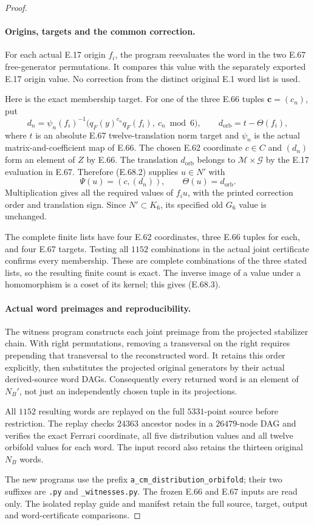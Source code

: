 \begin{proof}
\paragraph{Origins, targets and the common correction.}
For each actual E.17 origin $f_i$, the program
reevaluates the word in the two E.67 free-generator
permutations. It compares this value with the
separately exported E.17 origin value. No correction
from the distinct original E.1 word list is used.

Here is the exact membership target. For one of the
three E.66 tuples $\mathbf c=(c_n)$, put
\[
 d_n=
 \psi_n(f_i)^{-1}
       \bigl(q_F(y)^{c_n}q_F(f_i),\ c_n\bmod6\bigr),
 \qquad
 d_{\mathrm{orb}}=t-\Theta(f_i),
 \tag{E.68.7}
\]
where $t$ is an absolute E.67 twelve-translation norm
target and $\psi_n$ is the actual matrix-and-coefficient
map of E.66. The chosen E.62 coordinate $c\in C$
and $(d_n)$ form an element of $Z$ by E.66. The
translation $d_{\mathrm{orb}}$ belongs to
$\mathcal M\times\mathcal G$ by the E.17 evaluation
in E.67. Therefore \textup{(E.68.2)} supplies
$u\in N'$ with
\[
          \Psi(u)=(c,(d_n)),\qquad
          \Theta(u)=d_{\mathrm{orb}}.
 \tag{E.68.8}
\]
Multiplication gives all the required values of
$f_i u$, with the printed correction order and
translation sign. Since $N'\subset K_6$, its
specified old $G_6$ value is unchanged.

The complete finite lists have four E.62 coordinates,
three E.66 tuples for each, and four E.67 targets.
Testing all $1152$ combinations in the actual joint
certificate confirms every membership. These are
complete combinations of the three stated lists,
so the resulting finite count is exact. The inverse
image of a value under a homomorphism is a coset of
its kernel; this gives \textup{(E.68.3)}.

\paragraph{Actual word preimages and reproducibility.}
The witness program constructs each joint preimage
from the projected stabilizer chain. With right
permutations, removing a transversal on the right
requires prepending that transversal to the reconstructed
word. It retains this order explicitly, then substitutes
the projected original generators by their actual
derived-source word DAGs. Consequently every returned
word is an element of $N_B'$, not just an independently
chosen tuple in its projections.

All $1152$ resulting words are replayed on the full
$5331$-point source before restriction. The replay
checks $24363$ ancestor nodes in a $26479$-node DAG
and verifies the exact Ferrari coordinate, all five
distribution values and all twelve orbifold values
for each word. The input record also retains the
thirteen original $N_B$ words.

The new programs use the prefix
\texttt{a\_cm\_distribution\_orbifold}; their two
suffixes are \texttt{.py} and
\texttt{\_witnesses.py}. The frozen E.66 and E.67
inputs are read only. The isolated replay guide and
manifest retain the full source, target, output and
word-certificate comparisons.
\end{proof}
